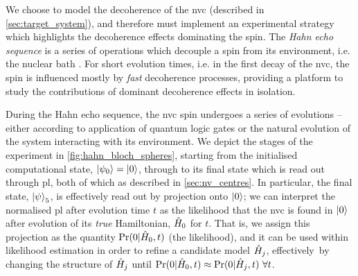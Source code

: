 We choose to model the decoherence of the \gls{nvc} (described in \cref{sec:target_system}), 
    and therefore must implement an experimental strategy which highlights 
    the decoherence effects dominating the spin. 
The \emph{Hahn echo sequence} is a series of operations which decouple a spin from its environment, i.e. the nuclear bath
    \cite{blok2014manipulating, childress2006coherent, rowan1965electron, charnock2001combined, gentile2020Operating}.
For short evolution times, i.e. in the first decay of the \gls{nvc}, the spin is influenced mostly by \emph{fast} decoherence processes,
    providing a platform to study the contributions of dominant decoherence effects in isolation. 

\par 
During the Hahn echo sequence, the \gls{nvc} spin undergoes a series of evolutions -- 
    either according to application of quantum logic gates
    or the natural evolution of the system interacting with its environment.  
We depict the stages of the experiment in \cref{fig:hahn_bloch_spheres}, 
    starting from the initialised computational state, $\ket{\psi_0} = \ket{0}$,
    through to its final state which is read out through \gls{pl},
    both of which as described in \cref{sec:nv_centres}.
In particular, the final state, $\ket{\psi}_5$, is effectively read out by projection onto $\ket{0}$;
    we can interpret the normalised \gls{pl} after evolution time $t$ as the  \gls{likelihood} 
    that the \gls{nvc} is found in $\ket{0}$ after evolution of its \emph{true} Hamiltonian, $\hat{H}_0$ for $t$. 
That is, we assign this projection as the quantity $\Pr(0 | \hat{H}_0, t)$ (the  \gls{likelihood}), 
    and it can be used within \gls{likelihood} estimation in order to refine a candidate model $\hat{H}_j$, 
    effectively\footnotemark \ by changing the structure of 
    $\hat{H}_j$ until $\Pr(0 | \hat{H}_0, t) \approx \Pr(0 | \hat{H}_j, t) \ \forall t$. 

